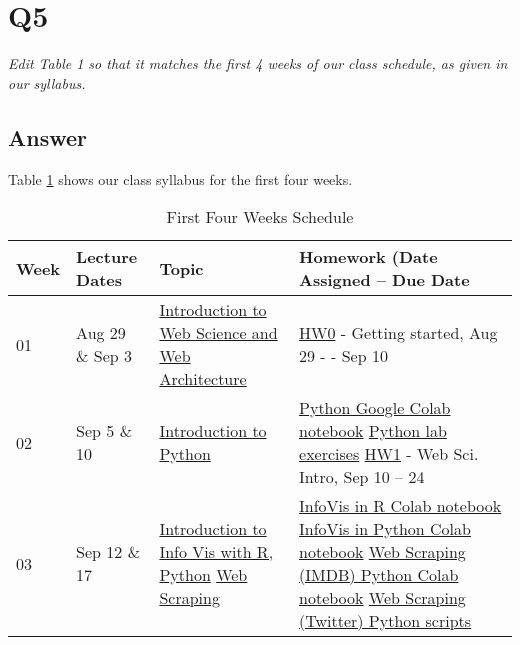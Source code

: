 \documentclass[12pt]{article}
\begin{document}
\section*{Q5}

\emph{Edit Table 1 so that it matches the first 4 weeks of our class schedule, as given in our syllabus.}

\subsection*{Answer}

Table \ref{tbl:schedule} shows our class syllabus for the first four weeks.

\begin{table}[h]
\centering
\caption{First Four Weeks Schedule}
\label{tbl:schedule}
\begin{tabular}{|l|l|p{50mm}|p{70mm}|}
\hline
\textbf{Week} & \textbf{Lecture Dates} & \textbf{Topic} & \textbf{Homework (Date Assigned -- Due Date} \\ \hline \hline
01 & Aug 29 \& Sep 3 & \href{https://docs.google.com/presentation/d/1sSNcXMBUJWb-rVbTEvKqFAC2SvJugI8m/edit#slide=id.p1}{Introduction to Web Science and Web Architecture} & \href{https://github.com/anwala/teaching-web-science/tree/main/fall-2024/homework/hw0}{HW0} - Getting started, Aug 29 - - Sep 10 \\ \hline
02 & Sep 5 \& 10 & \href{https://docs.google.com/presentation/d/1_TcgFerDRT0dZVX98-jMIJBMmV4_IAQg/}{Introduction to Python} & \href{https://github.com/anwala/teaching-web-science/blob/main/fall-2022/week-2/data_440_03_f22_mod_02_python.ipynb}{Python Google Colab notebook} \newline \href{https://github.com/anwala/teaching-web-science/blob/main/fall-2022/week-2/data_440_03_f22_mod_02_lab.ipynb}{Python lab exercises} \newline \href{https://github.com/anwala/teaching-web-science/tree/main/fall-2024/homework/hw1}{HW1} - Web Sci. Intro, Sep 10 -- 24 \\ \hline
03 & Sep 12 \& 17 & \href{https://docs.google.com/presentation/d/1pSywHD9i3aVNsWNxtcUfT1E2tP4mgcQv/}{Introduction to Info Vis with R, Python} \newline \href{https://docs.google.com/presentation/d/1vtT9dleNJlUbc3ny14gotGX1Md1dEWhVHYWTz0MMdRk/edit?usp=sharing}{Web Scraping} & \href{https://github.com/anwala/teaching-web-science/blob/main/fall-2022/week-3/data_440_03_f22_mod_03_info_vis_r.ipynb}{InfoVis in R Colab notebook} \newline \href{https://github.com/anwala/teaching-web-science/blob/main/fall-2022/week-3/data_440_03_f22_mod_03_info_vis_python.ipynb}{InfoVis in Python Colab notebook} \newline \href{https://github.com/anwala/teaching-web-science/blob/main/fall-2023/week-3/data_440_02_f23_mod_03_web_scraping_imdb.ipynb}{Web Scraping (IMDB) Python Colab notebook} \newline \href{https://github.com/anwala/teaching-web-science/blob/main/fall-2023/week-3/twitter-scraper/}{Web Scraping (Twitter) Python scripts} \\ \hline

\end{tabular}
\end{table}
\end{document}

